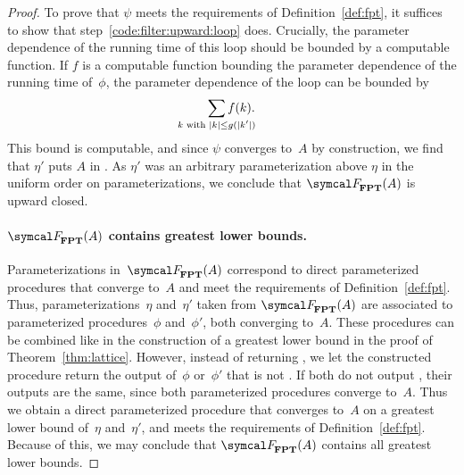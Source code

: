 \begin{proof}
  To prove that $\psi$ meets the requirements of Definition~\ref{def:fpt}, it suffices to show that step~\ref{code:filter:upward:loop} does.
  Crucially, the parameter dependence of the running time of this loop should be bounded by a computable function.
  If $f$ is a computable function bounding the parameter dependence of the running time of~$\phi$, the parameter dependence of the loop can be bounded by
  \begin{equation*}
    \sum_{\mathclap{k\text{ with }\length{k} \le g(\length{k'})}} f(k).
  \end{equation*}
  This bound is computable, and since $\psi$ converges to~$A$ by construction, we find that $\eta'$ puts $A$ in .
  As $\eta'$ was an arbitrary parameterization above $\eta$ in the uniform order on parameterizations, we conclude that $\calF_\cl{FPT}(A)$ is upward closed.

  \paragraph{$\calF_\cl{FPT}(A)$ contains greatest lower bounds.}
  Parameterizations in~$\calF_\cl{FPT}(A)$ correspond to direct parameterized procedures that converge to~$A$ and meet the requirements of Definition~\ref{def:fpt}.
  Thus, parameterizations~$\eta$ and~$\eta'$ taken from $\calF_\cl{FPT}(A)$ are associated to parameterized procedures~$\phi$ and~$\phi'$, both converging to~$A$.
  These procedures can be combined like in the construction of a greatest lower bound in the proof of Theorem~\ref{thm:lattice}.
  However, instead of returning , we let the constructed procedure return the output of~$\phi$ or~$\phi'$ that is not .
  If both do not output , their outputs are the same, since both parameterized procedures converge to~$A$.
  Thus we obtain a direct parameterized procedure that converges to~$A$ on a greatest lower bound of~$\eta$ and~$\eta'$, and meets the requirements of Definition~\ref{def:fpt}.
  Because of this, we may conclude that $\calF_\cl{FPT}(A)$ contains all greatest lower bounds.
\end{proof}

